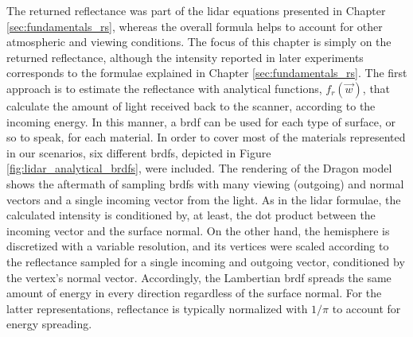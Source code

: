 The returned reflectance was part of the \acrshort{lidar} equations presented in Chapter \ref{sec:fundamentals_rs}, whereas the overall formula helps to account for other atmospheric and viewing conditions. The focus of this chapter is simply on the returned reflectance, although the intensity reported in later experiments corresponds to the formulae explained in Chapter \ref{sec:fundamentals_rs}. The first approach is to estimate the reflectance with analytical functions, $f_{r}(\vec{w})$, that calculate the amount of light received back to the scanner, according to the incoming energy. In this manner, a \acrshort{brdf} can be used for each type of surface, or so to speak, for each material. In order to cover most of the materials represented in our scenarios, six different \acrshort{brdf}s, depicted in Figure \ref{fig:lidar_analytical_brdfs}, were included. The rendering of the Dragon model shows the aftermath of sampling \acrshort{brdf}s with many viewing (outgoing) and normal vectors and a single incoming vector from the light. As in the \acrshort{lidar} formulae, the calculated intensity is conditioned by, at least, the dot product between the incoming vector and the surface normal. On the other hand, the hemisphere is discretized with a variable resolution, and its vertices were scaled according to the reflectance sampled for a single incoming and outgoing vector, conditioned by the vertex's normal vector. Accordingly, the Lambertian \acrshort{brdf} spreads the same amount of energy in every direction regardless of the surface normal. For the latter representations, reflectance is typically normalized with $1/\pi$ to account for energy spreading.

